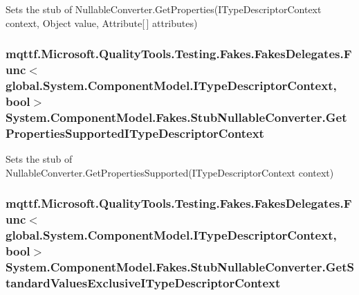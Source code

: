 Sets the stub of Nullable\-Converter.\-Get\-Properties(\-I\-Type\-Descriptor\-Context context, Object value, Attribute\mbox{[}$\,$\mbox{]} attributes)

\hypertarget{class_system_1_1_component_model_1_1_fakes_1_1_stub_nullable_converter_a5f01e07d0064ef551fd367579dabf2e4}{
\subsubsection[{Get\-Properties\-Supported\-I\-Type\-Descriptor\-Context}]{\setlength{\rightskip}{0pt plus 5cm}mqttf.\-Microsoft.\-Quality\-Tools.\-Testing.\-Fakes.\-Fakes\-Delegates.\-Func$<$global.\-System.\-Component\-Model.\-I\-Type\-Descriptor\-Context, bool$>$ System.\-Component\-Model.\-Fakes.\-Stub\-Nullable\-Converter.\-Get\-Properties\-Supported\-I\-Type\-Descriptor\-Context}}\label{class_system_1_1_component_model_1_1_fakes_1_1_stub_nullable_converter_a5f01e07d0064ef551fd367579dabf2e4}


Sets the stub of Nullable\-Converter.\-Get\-Properties\-Supported(\-I\-Type\-Descriptor\-Context context)

\hypertarget{class_system_1_1_component_model_1_1_fakes_1_1_stub_nullable_converter_a07495f550b11e246ee86d623c05f13a2}{
\subsubsection[{Get\-Standard\-Values\-Exclusive\-I\-Type\-Descriptor\-Context}]{\setlength{\rightskip}{0pt plus 5cm}mqttf.\-Microsoft.\-Quality\-Tools.\-Testing.\-Fakes.\-Fakes\-Delegates.\-Func$<$global.\-System.\-Component\-Model.\-I\-Type\-Descriptor\-Context, bool$>$ System.\-Component\-Model.\-Fakes.\-Stub\-Nullable\-Converter.\-Get\-Standard\-Values\-Exclusive\-I\-Type\-Descriptor\-Context}}\label{class_system_1_1_component_model_1_1_fakes_1_1_stub_nullable_converter_a07495f550b11e246ee86d623c05f13a2}


